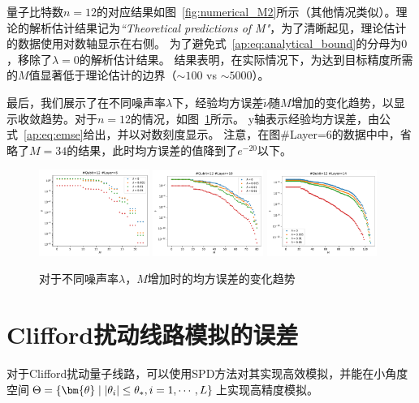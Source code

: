 量子比特数$n=12$的对应结果如图~\ref{fig:numerical_M2}所示（其他情况类似）。理论的解析估计结果记为\textit{``Theoretical predictions of M"}，为了清晰起见，理论估计的数据使用对数轴显示在右侧。
为了避免式~\eqref{ap:eq:analytical_bound}的分母为$0$，移除了$\lambda=0$的解析估计结果。
结果表明，在实际情况下，为达到目标精度所需的$M$值显著低于理论估计的边界（$\sim 100$ vs $\sim 5000$）。

最后，我们展示了在不同噪声率$\lambda$下，经验均方误差$\tilde{\nu}$随$M$增加的变化趋势，以显示收敛趋势。对于$n=12$的情况，如图~\ref{fig:numerical_MSE}所示。
y轴表示经验均方误差，由公式~\ref{ap:eq:emse}给出，并以对数刻度显示。
注意，在图\#Layer=6的数据中中，省略了$M=34$的结果，此时均方误差的值降到了$e^{-20}$以下。

\begin{figure}[htbp]
    \centering
    \includegraphics[width=0.32\textwidth]{figures/complexity2/mse_12_6.pdf}
    \includegraphics[width=0.32\textwidth]{figures/complexity2/mse_12_10.pdf}
    \includegraphics[width=0.32\textwidth]{figures/complexity2/mse_12_14.pdf}
    \caption{对于不同噪声率$\lambda$，$M$增加时的均方误差的变化趋势}\label{fig:numerical_MSE}
\end{figure}


\section{Clifford扰动线路模拟的误差}
对于Clifford扰动量子线路，可以使用SPD方法对其实现高效模拟，并能在小角度空间$\Theta=\{\bm{\theta}\mid \abs{\theta_i}\leq \theta_* ,i=1,\cdots,L \}$上实现高精度模拟。

